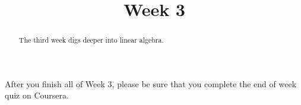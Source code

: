 \documentclass{ximera}
\title{Week 3}
\begin{document}
\begin{abstract}
  The third week digs deeper into linear algebra.
\end{abstract}

After you finish all of Week 3, please be sure that you complete the
end of week quiz on Coursera.
\end{document}
